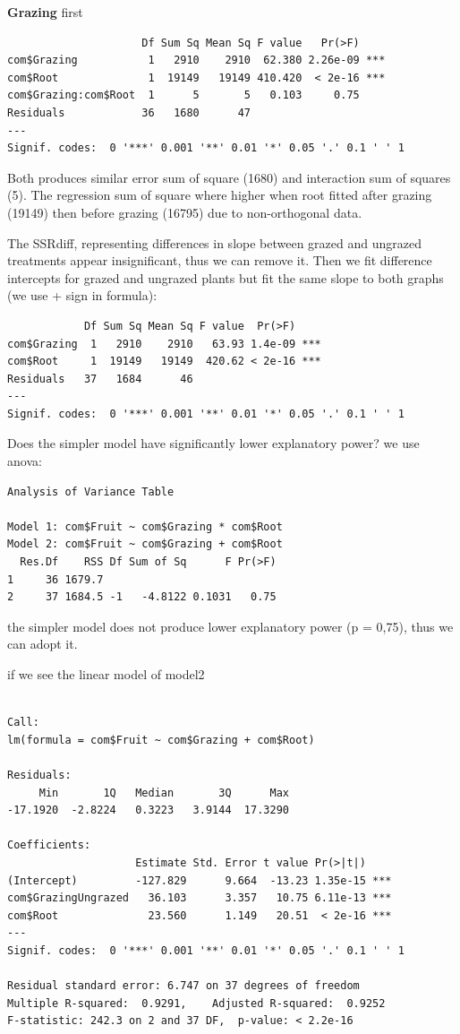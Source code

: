 \documentclass[
  letterpaper,
  DIV=11,
  numbers=noendperiod]{scrreprt}
\begin{document}
\textbf{Grazing} first

\begin{verbatim}
                     Df Sum Sq Mean Sq F value   Pr(>F)    
com$Grazing           1   2910    2910  62.380 2.26e-09 ***
com$Root              1  19149   19149 410.420  < 2e-16 ***
com$Grazing:com$Root  1      5       5   0.103     0.75    
Residuals            36   1680      47                     
---
Signif. codes:  0 '***' 0.001 '**' 0.01 '*' 0.05 '.' 0.1 ' ' 1
\end{verbatim}

Both produces similar error sum of square (1680) and interaction sum of
squares (5). The regression sum of square where higher when root fitted
after grazing (19149) then before grazing (16795) due to non-orthogonal
data.

The SSRdiff, representing differences in slope between grazed and
ungrazed treatments appear insignificant, thus we can remove it. Then we
fit difference intercepts for grazed and ungrazed plants but fit the
same slope to both graphs (we use + sign in formula):

\begin{verbatim}
            Df Sum Sq Mean Sq F value  Pr(>F)    
com$Grazing  1   2910    2910   63.93 1.4e-09 ***
com$Root     1  19149   19149  420.62 < 2e-16 ***
Residuals   37   1684      46                    
---
Signif. codes:  0 '***' 0.001 '**' 0.01 '*' 0.05 '.' 0.1 ' ' 1
\end{verbatim}

Does the simpler model have significantly lower explanatory power? we
use anova:

\begin{verbatim}
Analysis of Variance Table

Model 1: com$Fruit ~ com$Grazing * com$Root
Model 2: com$Fruit ~ com$Grazing + com$Root
  Res.Df    RSS Df Sum of Sq      F Pr(>F)
1     36 1679.7                           
2     37 1684.5 -1   -4.8122 0.1031   0.75
\end{verbatim}

the simpler model does not produce lower explanatory power (p = 0,75),
thus we can adopt it.

if we see the linear model of model2

\begin{verbatim}

Call:
lm(formula = com$Fruit ~ com$Grazing + com$Root)

Residuals:
     Min       1Q   Median       3Q      Max 
-17.1920  -2.8224   0.3223   3.9144  17.3290 

Coefficients:
                    Estimate Std. Error t value Pr(>|t|)    
(Intercept)         -127.829      9.664  -13.23 1.35e-15 ***
com$GrazingUngrazed   36.103      3.357   10.75 6.11e-13 ***
com$Root              23.560      1.149   20.51  < 2e-16 ***
---
Signif. codes:  0 '***' 0.001 '**' 0.01 '*' 0.05 '.' 0.1 ' ' 1

Residual standard error: 6.747 on 37 degrees of freedom
Multiple R-squared:  0.9291,    Adjusted R-squared:  0.9252 
F-statistic: 242.3 on 2 and 37 DF,  p-value: < 2.2e-16
\end{verbatim}
\end{document}

